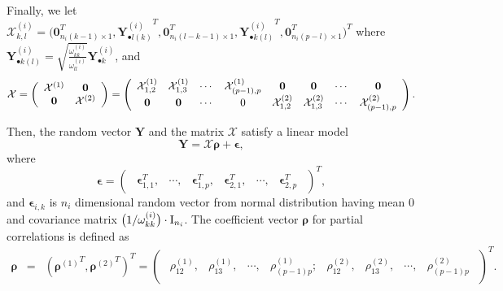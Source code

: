 \documentclass[useAMS,usenatbib,referee]{bio}
\newcommand{\bs}{\boldsymbol}
\begin{document}
{{Finally, we let 
$
\mathcal{X}^{(i)}_{k,l}
= \big( \mathbf{0}_{n_i(k-1)\times 1}^{T},
{\mathbf{Y}^{(i)}_{\bullet l(k)}}^T, \mathbf{0}_{n_i(l-k-1)\times 1}^T
, {\mathbf{Y}^{(i)}_{\bullet k(l)}}^T, \mathbf{0}_{n_i(p-l)\times 1}^T
\big)^T
$ where
$\mathbf{Y}^{(i)}_{\bullet k(l)} = \sqrt{\frac{\omega^{(i)}_{kk}}{\omega^{(i)}_{ll}}}
\mathbf{Y}^{(i)}_{\bullet k}$, and
\begin{equation*} \label{xmat}
\mathcal{X}=
\begin{pmatrix}
\begin{array}{cc}
{\mathcal{X} }^{(1)} & {\bf 0}\\
{\bf 0} & {\mathcal{X}}^{(2)}
\end{array}
\end{pmatrix}
=
\begin{pmatrix}
\begin{array}{cccccccc}
 \mathcal{X}_{1,2}^{(1)}&  \mathcal{X}_{1,3}^{(1)}&
 \cdots& \mathcal{X}^{(1)}_{(p-1),p}& {\bf 0}& {\bf 0}&
 \cdots&
 {\bf 0} \\
{\bf 0}&  {\bf 0}&
 \cdots& 0 &\mathcal{X}_{1,2}^{(2)}&  \mathcal{X}_{1,3}^{(2)}&
  \cdots& \mathcal{X}^{(2)}_{(p-1),p}
 \end{array}
 \end{pmatrix}.
\end{equation*}

Then, the random  vector $\mathbf{Y}$ and the matrix $\mathcal{X}$ satisfy a linear model
\begin{equation*} \label{eqn:linear}
\mathbf{Y}= \mathcal{X} \bs{\rho} + \bs{\epsilon,}
\end{equation*}
where
\begin{equation} \nonumber
\bs{\epsilon} =
\begin{pmatrix}
\begin{array}{cccccc}
\bs{\epsilon}_{1,1}^{ T},& \cdots ,&\bs{\epsilon}_{1,p}^{ T}, &
\bs{\epsilon}_{2,1}^{ T} ,& \cdots ,& \bs{\epsilon}_{2,p}^{ T}
\end{array}
\end{pmatrix}^{ T},
\end{equation}
 and $\bs{\epsilon}_{i,k}$ is $n_i$ dimensional random vector from normal distribution having mean $0$ and covariance matrix $\big(1/ \omega^{(i)}_{kk} \big) \cdot {\rm I}_{n_i}$. 
 The coefficient vector $\bs{\rho}$ for partial correlations is defined as
\begin{eqnarray} \nonumber
\bs{\rho}&=& ({\bs{\rho}^{(1)}}^T, {\bs{\rho}^{(2)}}^T)^T =
\begin{pmatrix}
\begin{array}{cccccccc}
 \rho^{(1)}_{12},& \rho^{(1)}_{13},&
 \cdots,& \rho^{(1)}_{(p-1)p};& \rho^{(2)}_{12},& \rho^{(2)}_{13},&
 \cdots,&
\rho^{(2)}_{(p-1)p}
 \end{array}
 \end{pmatrix}^{T}.
\end{eqnarray}


}}
\end{document}

